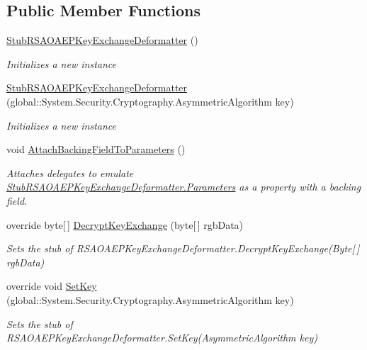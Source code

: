 \subsection*{Public Member Functions}
\begin{DoxyCompactItemize}
\item 
\hyperlink{class_system_1_1_security_1_1_cryptography_1_1_fakes_1_1_stub_r_s_a_o_a_e_p_key_exchange_deformatter_a2c694866613dd4487628565f8230d8ba}{Stub\-R\-S\-A\-O\-A\-E\-P\-Key\-Exchange\-Deformatter} ()
\begin{DoxyCompactList}\small\item\em Initializes a new instance\end{DoxyCompactList}\item 
\hyperlink{class_system_1_1_security_1_1_cryptography_1_1_fakes_1_1_stub_r_s_a_o_a_e_p_key_exchange_deformatter_a3fe0f1e711330c7f6349cabef01c1437}{Stub\-R\-S\-A\-O\-A\-E\-P\-Key\-Exchange\-Deformatter} (global\-::\-System.\-Security.\-Cryptography.\-Asymmetric\-Algorithm key)
\begin{DoxyCompactList}\small\item\em Initializes a new instance\end{DoxyCompactList}\item 
void \hyperlink{class_system_1_1_security_1_1_cryptography_1_1_fakes_1_1_stub_r_s_a_o_a_e_p_key_exchange_deformatter_a14e77f1e09c8539f927930b182c148b0}{Attach\-Backing\-Field\-To\-Parameters} ()
\begin{DoxyCompactList}\small\item\em Attaches delegates to emulate \hyperlink{class_system_1_1_security_1_1_cryptography_1_1_fakes_1_1_stub_r_s_a_o_a_e_p_key_exchange_deformatter_ab891b1e359e4b89ffdd2a42c02ce82d4}{Stub\-R\-S\-A\-O\-A\-E\-P\-Key\-Exchange\-Deformatter.\-Parameters} as a property with a backing field.\end{DoxyCompactList}\item 
override byte\mbox{[}$\,$\mbox{]} \hyperlink{class_system_1_1_security_1_1_cryptography_1_1_fakes_1_1_stub_r_s_a_o_a_e_p_key_exchange_deformatter_aa6e540825ccea0d651d20604fe4ae41d}{Decrypt\-Key\-Exchange} (byte\mbox{[}$\,$\mbox{]} rgb\-Data)
\begin{DoxyCompactList}\small\item\em Sets the stub of R\-S\-A\-O\-A\-E\-P\-Key\-Exchange\-Deformatter.\-Decrypt\-Key\-Exchange(\-Byte\mbox{[}$\,$\mbox{]} rgb\-Data)\end{DoxyCompactList}\item 
override void \hyperlink{class_system_1_1_security_1_1_cryptography_1_1_fakes_1_1_stub_r_s_a_o_a_e_p_key_exchange_deformatter_a38c36bb5d4e10120ed383e594c3f608a}{Set\-Key} (global\-::\-System.\-Security.\-Cryptography.\-Asymmetric\-Algorithm key)
\begin{DoxyCompactList}\small\item\em Sets the stub of R\-S\-A\-O\-A\-E\-P\-Key\-Exchange\-Deformatter.\-Set\-Key(\-Asymmetric\-Algorithm key)\end{DoxyCompactList}\end{DoxyCompactItemize}
